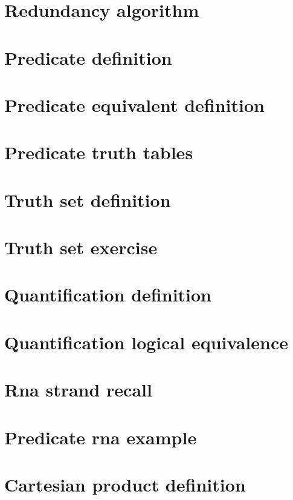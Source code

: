 \section*{Redundancy algorithm}

\vfill
\section*{Predicate definition}

\vfill
\section*{Predicate equivalent definition}

\vfill
\section*{Predicate truth tables}

\vfill
\section*{Truth set definition}

\vfill
\section*{Truth set exercise}

\vfill
\section*{Quantification definition}

\vfill
\section*{Quantification logical equivalence}

\vfill
\section*{Rna strand recall}

\vfill
\section*{Predicate rna example}

\vfill
\section*{Cartesian product definition}

\vfill
